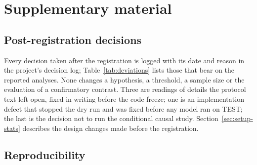 \section{Supplementary material}
\label{sec:appendix}

\subsection{Post-registration decisions}
\label{sec:appendix-deviations}

Every decision taken after the registration is logged with its date and reason in the project's decision log; Table~\ref{tab:deviations} lists those that bear on the reported analyses. None changes a hypothesis, a threshold, a sample size or the evaluation of a confirmatory contrast. Three are readings of details the protocol text left open, fixed in writing before the code freeze; one is an implementation defect that stopped the dry run and was fixed before any model ran on TEST; the last is the decision not to run the conditional causal study. Section~\ref{sec:setup-stats} describes the design changes made before the registration.

\begin{table}[htbp]
\centering
\caption{Post-registration decisions that bear on the reported analyses (identifiers of the project's decision log).}
\label{tab:deviations}
\small
{}
\end{table}

\subsection{Reproducibility}
\label{sec:appendix-repro}

